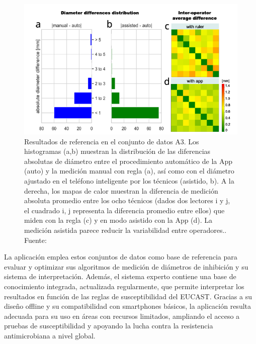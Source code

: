\begin{figure}[ht]
	\centering
	\includegraphics[width=\textwidth]{2/figures/R1.png}
	\caption{Resultados de referencia en el conjunto de datos A3. Los histogramas (a,b) muestran la distribución de las diferencias absolutas de diámetro entre el procedimiento automático de la App (auto) y la medición manual con regla (a), así como con el diámetro ajustado en el teléfono inteligente por los técnicos (asistido, b). A la derecha, los mapas de calor muestran la diferencia de medición absoluta promedio entre los ocho técnicos (dados dos lectores i y j, el cuadrado i, j representa la diferencia promedio entre ellos) que miden con la regla (c) y en modo asistido con la App (d). La medición asistida parece reducir la variabilidad entre operadores.. Fuente: \cite{pascucci2021}}
	\label{8:fig}
\end{figure}

La aplicación emplea estos conjuntos de datos como base de referencia para evaluar y optimizar sus algoritmos de medición de diámetros de inhibición y su sistema de interpretación. Además, el sistema experto contiene una base de conocimiento integrada, actualizada regularmente, que permite interpretar los resultados en función de las reglas de susceptibilidad del EUCAST. Gracias a su diseño offline y su compatibilidad con smartphones básicos, la aplicación resulta adecuada para su uso en áreas con recursos limitados, ampliando el acceso a pruebas de susceptibilidad y apoyando la lucha contra la resistencia antimicrobiana a nivel global.
 
